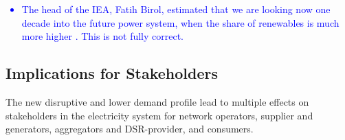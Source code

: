 \documentclass[energies,article,submit,moreauthors,pdftex]{Definitions/mdpi}
\begin{document}



\textcolor{blue}{
\begin{itemize}
    \item The head of the IEA, Fatih Birol, estimated that we are looking now one decade into the future power system, when the share of renewables is much more higher \cite{IgorTodorovic2020Birol:Balance}. This is not fully correct.
\end{itemize}
}

\subsection{Implications for Stakeholders}

The new disruptive and lower demand profile lead to multiple effects on stakeholders in the electricity system for network operators, supplier and generators, aggregators and DSR-provider, and consumers. 
\end{document}
